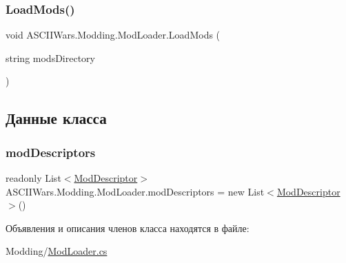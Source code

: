 \hypertarget{class_a_s_c_i_i_wars_1_1_modding_1_1_mod_loader_ae224a526624ed5311deddd3ec4a0b23f}{}\label{class_a_s_c_i_i_wars_1_1_modding_1_1_mod_loader_ae224a526624ed5311deddd3ec4a0b23f} 
\subsubsection{\texorpdfstring{Load\+Mods()}{LoadMods()}}
{\footnotesize\ttfamily void A\+S\+C\+I\+I\+Wars.\+Modding.\+Mod\+Loader.\+Load\+Mods (\begin{DoxyParamCaption}\item[{string}]{mods\+Directory }\end{DoxyParamCaption})\hspace{0.3cm}{\ttfamily [inline]}}



\subsection{Данные класса}
\hypertarget{class_a_s_c_i_i_wars_1_1_modding_1_1_mod_loader_a82e3e47bba4f2b077f2f2156954ea853}{}\label{class_a_s_c_i_i_wars_1_1_modding_1_1_mod_loader_a82e3e47bba4f2b077f2f2156954ea853} 
\subsubsection{\texorpdfstring{mod\+Descriptors}{modDescriptors}}
{\footnotesize\ttfamily readonly List$<$\hyperlink{class_a_s_c_i_i_wars_1_1_modding_1_1_mod_descriptor}{Mod\+Descriptor}$>$ A\+S\+C\+I\+I\+Wars.\+Modding.\+Mod\+Loader.\+mod\+Descriptors = new List$<$\hyperlink{class_a_s_c_i_i_wars_1_1_modding_1_1_mod_descriptor}{Mod\+Descriptor}$>$()}



Объявления и описания членов класса находятся в файле\+:\begin{DoxyCompactItemize}
\item 
Modding/\hyperlink{_mod_loader_8cs}{Mod\+Loader.\+cs}\end{DoxyCompactItemize}
